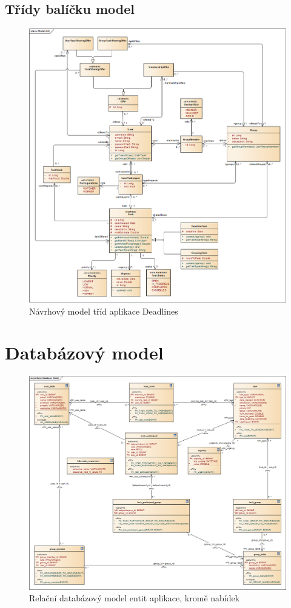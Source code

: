 \documentclass[thesis=B,czech]{FITthesis}[2012/06/26]
\begin{document}
\section{Třídy balíčku model}
\begin{figure}\centering
	\includegraphics[width=1\textwidth]{ea-diagrams/class-model.png}
	\caption[Model tříd]{Návrhový model tříd aplikace Deadlines}
	\label{diagram:class-model}
\end{figure}

\chapter{Databázový model}
\begin{figure}\centering
	\includegraphics[width=1\textwidth]{ea-diagrams/database/base.png}
	\caption[Databázový model]{Relační databázový model entit aplikace, kromě nabídek}
	\label{diagram:database-model-base}
\end{figure}
\end{document}

